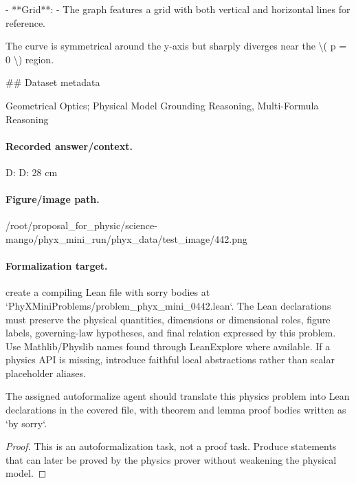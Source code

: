 - **Grid**:
  - The graph features a grid with both vertical and horizontal lines for reference.

The curve is symmetrical around the y-axis but sharply diverges near the  \textbackslash{}( p = 0 \textbackslash{}) region.

\#\# Dataset metadata

Geometrical Optics; Physical Model Grounding Reasoning, Multi-Formula Reasoning

\paragraph{Recorded answer/context.}
D: D: 28 cm

\paragraph{Figure/image path.}
/root/proposal\_for\_physic/science-mango/phyx\_mini\_run/phyx\_data/test\_image/442.png

\paragraph{Formalization target.}
create a compiling Lean file with sorry bodies at `PhyXMiniProblems/problem\_phyx\_mini\_0442.lean`. The Lean declarations must preserve the physical quantities, dimensions or dimensional roles, figure labels, governing-law hypotheses, and final relation expressed by this problem.
Use Mathlib/Physlib names found through LeanExplore where available. If a physics API is missing, introduce faithful local abstractions rather than scalar placeholder aliases.

\begin{theorem}
\label{thm:physics:phyx_mini_0442:target}
The assigned autoformalize agent should translate this physics problem into Lean declarations in the covered file, with theorem and lemma proof bodies written as `by sorry`.
\end{theorem}
\begin{proof}
This is an autoformalization task, not a proof task. Produce statements that can later be proved by the physics prover without weakening the physical model.
\end{proof}

